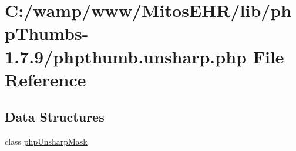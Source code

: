 \hypertarget{phpthumb_8unsharp_8php}{\section{\-C\-:/wamp/www/\-Mitos\-E\-H\-R/lib/php\-Thumbs-\/1.7.9/phpthumb.unsharp.\-php \-File \-Reference}
\label{phpthumb_8unsharp_8php}
}
\subsection*{\-Data \-Structures}
\begin{DoxyCompactItemize}
\item 
class \hyperlink{classphp_unsharp_mask}{php\-Unsharp\-Mask}
\end{DoxyCompactItemize}
